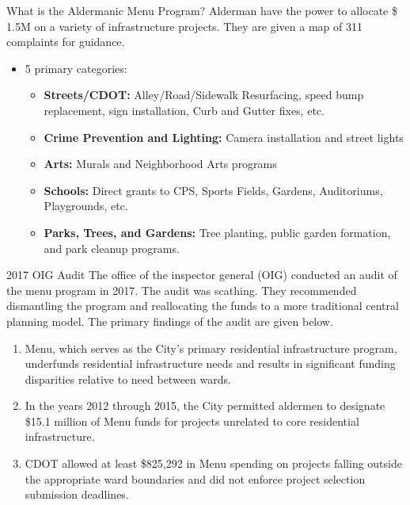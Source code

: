 \begin{frame}{What is the Aldermanic Menu Program?}
        Alderman have the power to allocate \$ 1.5M on a variety of infrastructure projects. They are given a map of 311 complaints for guidance.
    \begin{itemize}
        \item  5 primary categories:
        \begin{itemize}
            \item \textbf{Streets/CDOT:} Alley/Road/Sidewalk Resurfacing, speed bump replacement, sign installation, Curb and Gutter fixes, etc. 
            \item \textbf{Crime Prevention and Lighting:} Camera installation and street lights
            \item \textbf{Arts:} Murals and Neighborhood Arts programs
            \item \textbf{Schools:} Direct grants to CPS, Sports Fields, Gardens, Auditoriums, Playgrounds, etc. 
            \item \textbf{Parks, Trees, and Gardens:} Tree planting, public garden formation, and park cleanup programs. 
        \end{itemize}
    \end{itemize}
\end{frame}

\begin{frame}{2017 OIG Audit}
        The office of the inspector general (OIG) conducted an audit of the menu program in 2017.
        The audit was scathing. 
        They recommended dismantling the program and reallocating the funds to a more traditional central planning model.
        The primary findings of the audit are given below.
    \begin{enumerate}
        \item  Menu, which serves as the City's primary residential infrastructure
        program, underfunds residential infrastructure needs and results in
        significant funding disparities relative to need between wards.
        \item   In the years 2012 through 2015, the City permitted aldermen to designate
        \$15.1 million of Menu funds for projects unrelated to core residential
        infrastructure.
        \item CDOT allowed at least \$825,292 in Menu spending on projects falling outside
        the appropriate ward boundaries and did not enforce project selection
        submission deadlines.
    \end{enumerate}
\end{frame}